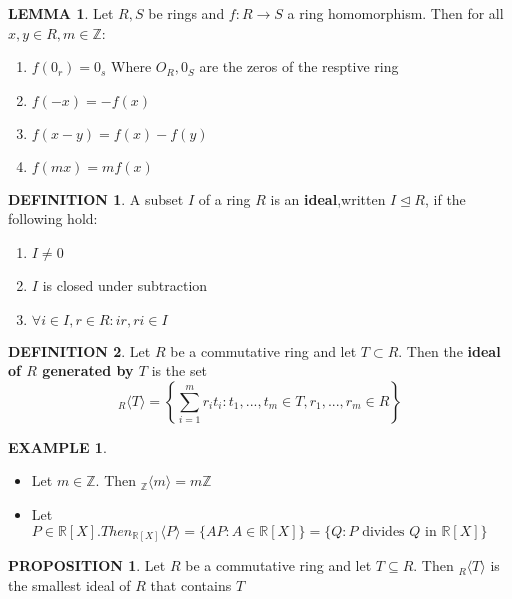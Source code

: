 \documentclass[12pt]{article}
\theoremstyle{definition}
\newtheorem{definition}{DEFINITION}[subsection]
\newtheorem{lemma}{LEMMA}[subsection]
\newtheorem{prop}{PROPOSITION}[subsection]
\newtheorem{example}{EXAMPLE}[subsection]
\begin{document}
\begin{lemma}
    Let $R,S$ be rings and $f:R\rightarrow S$ a ring homomorphism. Then for all $x,y\in R, m\in \mathbb{Z}$:
    \begin{enumerate}
        \item $f(0_r) = 0_s$ Where $O_R,0_S$ are the zeros of the resptive ring
        \item $f(-x) = -f(x)$
        \item $f(x-y) = f(x) - f(y)$
        \item $f(mx) = mf(x)$
    \end{enumerate}
\end{lemma}

\begin{definition}
    A subset $I$ of a ring $R$ is an \textbf{ideal},written $I \trianglelefteq R$, if the following hold:
    \begin{enumerate}
        \item $I \neq 0$
        \item $I$ is closed under subtraction
        \item $\forall i \in I, r\in R: ir,ri\in I$
    \end{enumerate} 
\end{definition}

\begin{definition}
    Let $R$ be a commutative ring and let $T \subset R$. Then the \textbf{ideal of $R$ generated by $T$} is the set
    $$_R\langle T\rangle = \left\{\sum_{i=1}^m{r_it_i}: t_1,...,t_m\in T, r_1,...,r_m \in R\right\}$$
\end{definition}

\begin{example}
    \quad
    \begin{itemize}
        \item Let $m \in \mathbb{Z}$. Then $_\mathbb{Z}\langle m \rangle = m\mathbb{Z}$
        \item Let $P \in \mathbb{R}[X]. Then _{\mathbb{R}[X]}\langle P \rangle = \{AP: A \in \mathbb{R}[X]\} = \{Q:P \text{ divides } Q \text{ in } \mathbb{R}[X]\}$
    \end{itemize}
\end{example}

\begin{prop}
    Let $R$ be a commutative ring and let $T \subseteq R$. Then $_R\langle T \rangle$ is the smallest ideal of $R$ that contains $T$
\end{prop}
\end{document}
